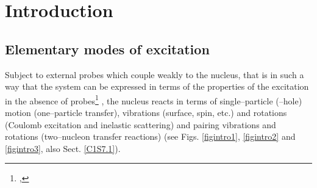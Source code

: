 \chapter{Introduction}\label{intro}
 \section{Elementary modes of excitation}
Subject to external probes which couple weakly to the nucleus, that is in such a way that the system can be expressed in terms of the properties of the excitation in the absence of probes\footnote{\cite{Pines:66},\cite{Bohr:75}} , the nucleus reacts  in terms  of single--particle (--hole) motion (one--particle transfer), vibrations (surface, spin, etc.) and rotations (Coulomb excitation and inelastic scattering) and pairing vibrations and rotations (two--nucleon transfer reactions) (see Figs. \ref{figintro1}, \ref{figintro2} and \ref{figintro3}, also Sect. \ref{C1S7.1}).

